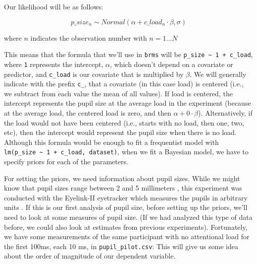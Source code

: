 \documentclass[12pt,]{krantz}
\newenvironment{Shaded}{\begin{snugshade}}{\end{snugshade}}
\newcommand{\KeywordTok}[1]{\textcolor[rgb]{0.13,0.29,0.53}{\textbf{#1}}}
\newcommand{\NormalTok}[1]{#1}
\newcommand{\OperatorTok}[1]{\textcolor[rgb]{0.81,0.36,0.00}{\textbf{#1}}}
\newcommand{\StringTok}[1]{\textcolor[rgb]{0.31,0.60,0.02}{#1}}
\theoremstyle{definition}
\theoremstyle{definition}
\theoremstyle{definition}
\theoremstyle{remark}
\begin{document}
Our likelihood will be as follows:

\begin{equation}
p\_size_n \sim Normal(\alpha + c\_load_n \cdot \beta,\sigma)
\end{equation}

where \(n\) indicates the observation number with \(n = 1 \ldots N\)

This means that the formula that we'll use in \texttt{brms} will be \texttt{p\_size\ \textasciitilde{}\ 1\ +\ c\_load}, where \texttt{1} represents the intercept, \(\alpha\), which doesn't depend on a covariate or predictor, and \texttt{c\_load} is our covariate that is multiplied by \(\beta\). We will generally indicate with the prefix \texttt{c\_}, that a covariate (in this case load) is centered (i.e., we subtract from each value the mean of all values). If load is centered, the intercept represents the pupil size at the average load in the experiment (because at the average load, the centered load is zero, and then \(\alpha + 0 \cdot \beta\)). Alternatively, if the load would not have been centered (i.e., starts with no load, then one, two, etc), then the intercept would represent the pupil size when there is no load. Although this formula would be enough to fit a frequentist model with \texttt{lm(p\_size\ \textasciitilde{}\ 1\ +\ c\_load,\ dataset)}, when we fit a Bayesian model, we have to specify priors for each of the parameters.

For setting the priors, we need information about pupil sizes. While we might know that pupil sizes range between 2 and 5 millimeters \citep{reference}, this experiment was conducted with the Eyelink-II eyetracker which measures the pupils in arbitrary units \citep{hayesMappingCorrectingInfluence2016}. If this is our first analysis of pupil size, before setting up the priors, we'll need to look at some measures of pupil size. (If we had analyzed this type of data before, we could also look at estimates from previous experiments). Fortunately, we have some measurements of the same participant with no attentional load for the first 100ms, each 10 ms, in \texttt{pupil\_pilot.csv}: This will give us some idea about the order of magnitude of our dependent variable.

\begin{Shaded}
\end{Shaded}
\end{document}

